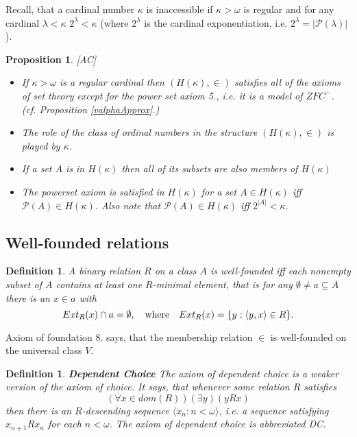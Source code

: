 \documentclass[a4paper,11pt,oneside]{mybook}
\def\pw{{{\mathcal P}}}
\theoremstyle{theorem}
\newtheorem{proposition}[subsection]{Proposition}
\newtheorem{definition}[subsection]{Definition}
\theoremstyle{example}
\begin{document}
{Recall, that a cardinal number $\kappa$ is inaccessible if $\kappa>\omega$ is regular and for any cardinal $\lambda<\kappa$
$2^\lambda<\kappa$ (where $2^\lambda$ is the cardinal exponentiation, i.e. $2^\lambda=|\pw(\lambda)|$).

\begin{proposition}{\rm [AC]}
\begin{itemize}
 \item[(i)] If $\kappa>\omega$ is a regular cardinal then $(H(\kappa),\in)$ satisfies all of the axioms of set theory
 except for the power set axiom 5., i.e. it is a model of $ZFC^-$. (cf. Proposition \ref{valphaApprox}.)
 \item[(ii)] The role of the class of ordinal numbers in the structure $(H(\kappa),\in)$ is played by $\kappa$. %
 \item[(iii)] If a set $A$ is in $H(\kappa)$ then all of its subsets are also members of $H(\kappa)$
 \item[(iv)] The powerset axiom is satisfied in $H(\kappa)$ for a set $A\in H(\kappa)$ iff $\pw(A)\in H(\kappa)$. Also note that
         $\pw(A)\in H(\kappa)$ iff $2^{|A|}<\kappa$.
\end{itemize}
\end{proposition}

\subsection{Well-founded relations}

\begin{definition}\label{ext}
A binary relation $R$ on a class $A$ is \emph{well-founded}
iff each nonempty subset of $A$ contains at least one
 $R$-minimal element, that is for any $\emptyset\neq a\subseteq A$ there is an $x\in a$ with
 $$ %
  Ext_R(x) \cap a = \emptyset,\quad\hbox{where}\quad Ext_R(x)=\{ y:\langle y,x\rangle\in R\}.
 $$ %
\end{definition}

Axiom of foundation 8. says, that the membership relation $\in$ is well-founded on the universal class $V$.

\begin{definition}\label{DC}
{\bf Dependent Choice} The axiom of dependent choice is a weaker
version of the axiom of choice. It says, that
whenever some relation $R$ satisfies
$$ %
  (\forall x\in dom(R))(\exists y)(yRx)
$$ %
then there is an $R$-descending sequence $\langle x_n:n<\omega\rangle$,
i.e. a sequence satisfying $x_{n+1}R x_n$ for each $n<\omega$.
The axiom of dependent choice is abbreviated DC.
\end{definition}

}
\end{document}
